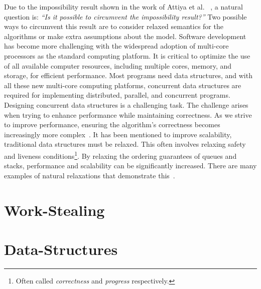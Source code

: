 Due to the impossibility result shown in the work of Attiya et al. ~\cite{DBLP_conf_popl_AttiyaGHKMV11}, a natural question is: \textit{``Is it possible to circumvent the impossibility result?''} Two possible ways to circumvent this result are to consider relaxed semantics for the algorithms or make extra assumptions about the model.  
Software development has become more challenging with the widespread adoption of multi-core processors as the standard computing platform. It is critical to optimize the use of all available computer resources, including multiple cores, memory, and storage, for efficient performance. Most programs need data structures, and with all these new multi-core computing platforms, concurrent data structures are required for implementing distributed, parallel, and concurrent programs. Designing concurrent data structures is a challenging task. The challenge arises when trying to enhance performance while maintaining correctness. As we strive to improve performance, ensuring the algorithm's correctness becomes increasingly more complex~\cite{DBLP_journals_cacm_Shavit11}. It has been mentioned to improve scalability, traditional data structures must be relaxed. This often involves relaxing safety and liveness conditions\footnote{Often called \textit{correctness} and \textit{progress} respectively.}. By relaxing the ordering guarantees of queues and stacks, performance and scalability can be significantly increased. There are many examples of natural relaxations that demonstrate this~\cite{DBLP_journals_cacm_Shavit11}.


\section{\label{section:work-stealing}Work-Stealing}
\section{\label{section:data-structures}Data-Structures}



